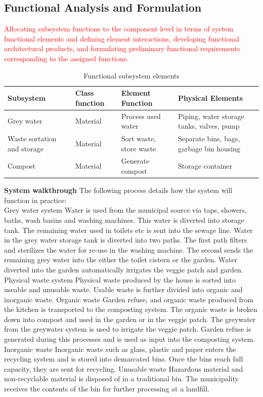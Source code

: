 \documentclass[a4paper,11pt,fleqn]{report}
\begin{document}
\subsection{Functional Analysis and Formulation} 
\textcolor{red}{Allocating subsystem functions to the component level in terms of system functional elements and defining element interactions, developing functional architectural products, and formulating preliminary functional requirements corresponding to the assigned functions.}
%
\begin{table}[h!]
\caption {Functional subsystem elements} \label{tb: Functional_SS_elements} 
\begin{center}
\begin{tabular}{p{4cm}|p{4cm}|p{4cm}|p{4cm}}\toprule
	{\textbf{Subsystem}} & {\textbf{Class function}} & {\textbf{Element Function}} & {\textbf{Physical Elements}}\\ \midrule
    Grey water & Material & Process used water & Piping, water storage tanks, valves, pump\\
    \hline
    Waste sortation and storage & Material & Sort waste, store waste & Separate bins, bags, garbage bin housing\\
    \hline
        Compost & Material & Generate compost & Storage container\\
    \bottomrule
\end{tabular}
\end{center}
\end{table}
%
\textbf{System walkthrough}
The following process details how the system will function in practice:\\

Grey water system
Water is used from the municipal source via taps, showers, baths, wash basins and washing machines. This water is diverted into storage tank. The remaining water used in toilets etc is sent into the sewage line.
Water in the grey water storage tank is diverted into two paths.
The first path filters and sterilizes the water for re-use in the washing machine.
The second sends the remaining grey water into the either the toilet cistern or the garden.
Water diverted into the garden automatically irrigates the veggie patch and garden.
Physical waste system
Physical waste produced by the house is sorted into useable and unusable waste.
Usable waste is further divided into organic and inorganic waste.
Organic waste
Garden refuse, and organic waste produced from the kitchen is transported to the composting system.
The organic waste is broken down into compost and used in the garden or in the veggie patch.
The greywater from the greywater system is used to irrigate the veggie patch.
Garden refuse is generated during this processes and is used as input into the composting system.
Inorganic waste
Inorganic waste such as glass, plastic and paper enters the recycling system and is stored into demarcated bins.
Once the bins reach full capacity, they are sent for recycling.
Unusable waste
Hazardous material and non-recyclable material is disposed of in a traditional bin.
The municipality receives the contents of the bin for further processing at a landfill.
\end{document}
